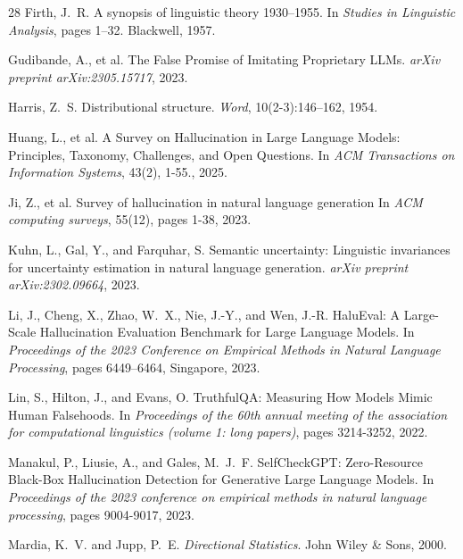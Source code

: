 \documentclass[11pt]{article}
\begin{document}
\begin{thebibliography}{28}
Firth, J.~R.
\newblock A synopsis of linguistic theory 1930--1955.
\newblock In \emph{Studies in Linguistic Analysis}, pages 1--32. Blackwell, 1957.

Gudibande, A., et al.
\newblock The False Promise of Imitating Proprietary LLMs.
\newblock \emph{arXiv preprint arXiv:2305.15717}, 2023.

Harris, Z.~S.
\newblock Distributional structure.
\newblock \emph{Word}, 10(2-3):146--162, 1954.

Huang, L., et al.
\newblock A Survey on Hallucination in Large Language Models: Principles, Taxonomy, Challenges, and Open Questions.
\newblock In \emph{ACM Transactions on Information Systems}, 43(2), 1-55., 2025.

Ji, Z., et al.
\newblock Survey of hallucination in natural language generation
\newblock In \emph{ACM computing surveys}, 55(12), pages 1-38, 2023.

Kuhn, L., Gal, Y., and Farquhar, S.
\newblock Semantic uncertainty: Linguistic invariances for uncertainty estimation in natural language generation.
\newblock \emph{arXiv preprint arXiv:2302.09664}, 2023.

Li, J., Cheng, X., Zhao, W.~X., Nie, J.-Y., and Wen, J.-R.
\newblock HaluEval: A Large-Scale Hallucination Evaluation Benchmark for Large Language Models.
\newblock In \emph{Proceedings of the 2023 Conference on Empirical Methods in Natural Language Processing}, pages 6449–6464, Singapore, 2023.

Lin, S., Hilton, J., and Evans, O.
\newblock TruthfulQA: Measuring How Models Mimic Human Falsehoods.
\newblock In \emph{Proceedings of the 60th annual meeting of the association for computational linguistics (volume 1: long papers)}, pages 3214-3252, 2022.

Manakul, P., Liusie, A., and Gales, M.~J.~F.
\newblock SelfCheckGPT: Zero-Resource Black-Box Hallucination Detection for Generative Large Language Models.
\newblock In \emph{Proceedings of the 2023 conference on empirical methods in natural language processing}, pages 9004-9017, 2023.

Mardia, K.~V. and Jupp, P.~E.
\newblock \emph{Directional Statistics}.
\newblock John Wiley \& Sons, 2000.


\end{thebibliography}
\end{document}
